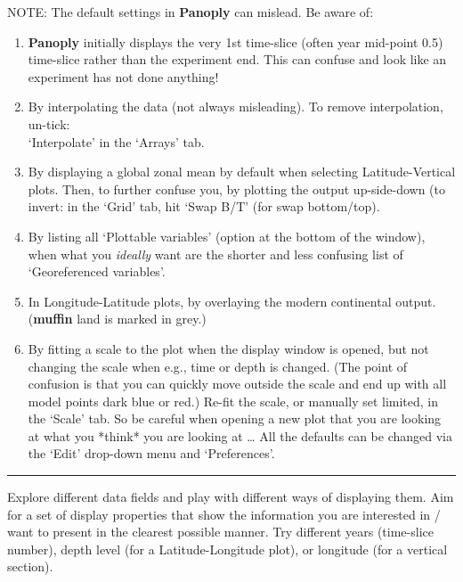\documentclass[11pt,fleqn]{book} %
\begin{document}
\vspace{1mm}
NOTE: The default settings in \textbf{Panoply} can mislead. Be aware of:
\vspace{1mm}
\begin{enumerate}
\item \textbf{Panoply} initially displays the very 1st time-slice (often year mid-point 0.5) time-slice rather than the experiment end. This can confuse and look like an experiment has not done anything!
\item By interpolating the data (not always misleading). To remove interpolation, un-tick:
\\‘\textsf{\footnotesize Interpolate}’ in the ‘\textsf{\footnotesize Arrays}’ tab.
\item By displaying a global zonal mean by default when selecting \textsf{\footnotesize Latitude-Vertical} plots. Then, to further confuse you, by plotting the output up-side-down (to invert: in the ‘\textsf{\footnotesize Grid}’ tab, hit ‘\textsf{\footnotesize Swap B/T}’ (for swap bottom/top).
\item By listing all ‘\textsf{\footnotesize Plottable variables}’ (option at the bottom of the window), when what you \textit{ideally} want are  the shorter and less confusing list of ‘\textsf{\footnotesize Georeferenced variables}’.
\item In \textsf{\footnotesize Longitude-Latitude} plots, by overlaying the modern continental output. (\textbf{muffin} land is marked in grey.)
\item By fitting a scale to the plot when the display window is opened, but not changing the scale when e.g., time or depth is changed. (The point of confusion is that you can quickly move outside the scale and end up with all model points dark blue or red.) Re-fit the scale, or manually set limited, in the ‘\textsf{\footnotesize Scale}’ tab.
So be careful when opening a new plot that you are looking at what you *think* you are looking at …
All the defaults can be changed via the ‘\textsf{\footnotesize Edit}’ drop-down menu and ‘\textsf{\footnotesize Preferences}’.
\end{enumerate}

\vspace{1mm}
\noindent\rule{4cm}{0.1mm}
\vspace{2mm}

\noindent Explore different data fields and play with different ways of displaying them. Aim for a set of display properties that show the information you are interested in / want to present in the clearest possible manner. Try different years (time-slice number), depth level (for a Latitude-Longitude plot), or longitude (for a vertical section).
\end{document}
